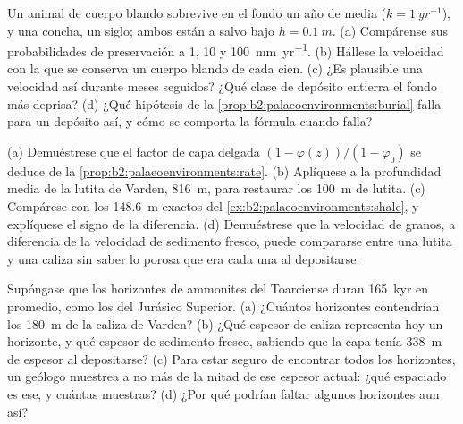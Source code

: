 \begin{exercise}[$\star\star\star$]\label{exo:b2:palaeoenvironments:10}
Un animal de cuerpo blando sobrevive en el fondo un año de media ($k = \qty{1}{yr^{-1}}$), y una
concha, un siglo; ambos están a salvo bajo $h = \qty{0.1}{m}$. (a) Compárense sus probabilidades de
preservación a 1, 10 y \qty{100}{mm.yr^{-1}}. (b) Hállese la velocidad con la que se conserva un cuerpo blando de cada
cien. (c) ¿Es plausible una velocidad así durante meses seguidos? ¿Qué clase de depósito entierra
el fondo más deprisa? (d) ¿Qué hipótesis de la \cref{prop:b2:palaeoenvironments:burial} falla para un
depósito así, y cómo se comporta la fórmula cuando falla?
\end{exercise}

\begin{exercise}[$\star\star\star$]\label{exo:b2:palaeoenvironments:11}
(a) Demuéstrese que el factor de capa delgada $(1 - \varphi(z))/(1 - \varphi_0)$ se deduce de la
\cref{prop:b2:palaeoenvironments:rate}. (b) Aplíquese a la profundidad media de la lutita de Varden,
\qty{816}{m}, para restaurar los \qty{100}{m} de lutita. (c) Compárese con los \qty{148.6}{m} exactos del
\cref{ex:b2:palaeoenvironments:shale}, y explíquese el signo de la diferencia. (d) Demuéstrese que la
velocidad de granos, a diferencia de la velocidad de sedimento fresco, puede compararse entre una lutita y una caliza
sin saber lo porosa que era cada una al depositarse.
\end{exercise}

\begin{exercise}[$\star\star\star$]\label{exo:b2:palaeoenvironments:12}
Supóngase que los horizontes de ammonites del Toarciense duran \qty{165}{kyr} en promedio, como los del Jurásico Superior.
(a) ¿Cuántos horizontes contendrían los \qty{180}{m} de la caliza de Varden? (b) ¿Qué espesor de
caliza representa hoy un horizonte, y qué espesor de sedimento fresco, sabiendo que la
capa tenía \qty{338}{m} de espesor al depositarse? (c) Para estar seguro de encontrar todos los horizontes, un
geólogo muestrea a no más de la mitad de ese espesor actual: ¿qué espaciado es ese, y cuántas
muestras? (d) ¿Por qué podrían faltar algunos horizontes aun así?
\end{exercise}

